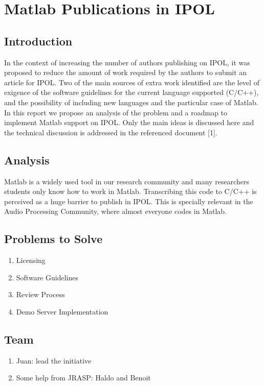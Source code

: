 \chapter{Matlab Publications in IPOL}

\section{Introduction}

In the context of increasing the number of authors publishing on IPOL, it was proposed to reduce the amount of work required by the authors to submit an article for IPOL.
Two of the main sources of extra work identified are the level of exigence of the software guidelines for the current language supported (C/C++), and the possibility of including new languages and the particular case of Matlab.
In this report we propose an analysis of the problem and a roadmap to implement Matlab support on IPOL. Only the main ideas is discussed here and the technical discussion is addressed in the referenced document [1].

\section{Analysis}

Matlab is a widely used tool in our research community and many researchers students only know how to work in Matlab. Transcribing this code to C/C++ is perceived as a huge barrier to publish in IPOL. This is specially relevant in the Audio Processing Community, where almost everyone codes in Matlab.

\section{Problems to Solve}
\begin{enumerate}
\item Licensing
\item Software Guidelines
\item Review Process
\item Demo Server Implementation
\end{enumerate}

\section{Team}
\begin{enumerate}
\item Juan: lead the initiative
\item Some help from JRASP: Haldo and Benoit
\end{enumerate}

